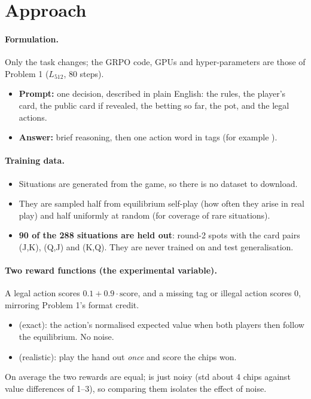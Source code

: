 \documentclass[10.5pt]{article}
\begin{document}
\section{Approach}
\paragraph{Formulation.} Only the task changes; the GRPO code, GPUs and hyper-parameters are those of Problem 1
($L_{512}$, 80 steps).
\begin{itemize}
\item \textbf{Prompt:} one decision, described in plain English: the rules, the player's card, the public card if
  revealed, the betting so far, the pot, and the legal actions.
\item \textbf{Answer:} brief reasoning, then one action word in  tags (for example
  ).
\end{itemize}

\paragraph{Training data.}
\begin{itemize}
\item Situations are generated from the game, so there is no dataset to download.
\item They are sampled half from equilibrium self-play (how often they arise in real play) and half uniformly at random
  (for coverage of rare situations).
\item \textbf{90 of the 288 situations are held out}: round-2 spots with the card pairs (J,K), (Q,J) and (K,Q). They are
  never trained on and test generalisation.
\end{itemize}

\paragraph{Two reward functions (the experimental variable).} A legal action scores $0.1+0.9\cdot\text{score}$, and a
missing tag or illegal action scores 0, mirroring Problem 1's format credit.
\begin{itemize}
\item {} (exact): the action's normalised expected value when both players then follow the equilibrium. No noise.
\item {} (realistic): play the hand out \emph{once} and score the chips won.
\end{itemize}
On average the two rewards are equal;  is just noisy (std about 4 chips against value differences of 1--3),
so comparing them isolates the effect of noise.
\end{document}

